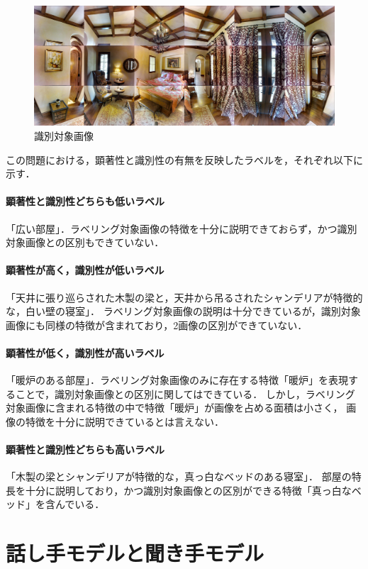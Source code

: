 \documentclass[a4paper,11pt]{jreport}
\begin{document}
\begin{figure}[H]
	\centering
	\includegraphics[width=0.8\linewidth]{figures/3-2_pink_bed.jpg}
	\caption{識別対象画像}
	\label{fig:pink_bed}
\end{figure}

この問題における，顕著性と識別性の有無を反映したラベルを，それぞれ以下に示す．

\paragraph*{顕著性と識別性どちらも低いラベル}
「広い部屋」．ラベリング対象画像の特徴を十分に説明できておらず，かつ識別対象画像との区別もできていない．
\paragraph*{顕著性が高く，識別性が低いラベル}
「天井に張り巡らされた木製の梁と，天井から吊るされたシャンデリアが特徴的な，白い壁の寝室」．
ラベリング対象画像の説明は十分できているが，識別対象画像にも同様の特徴が含まれており，2画像の区別ができていない．
\paragraph*{顕著性が低く，識別性が高いラベル}
「暖炉のある部屋」．ラベリング対象画像のみに存在する特徴「暖炉」を表現することで，識別対象画像との区別に関してはできている．
しかし，ラベリング対象画像に含まれる特徴の中で特徴「暖炉」が画像を占める面積は小さく，
画像の特徴を十分に説明できているとは言えない．
\paragraph*{顕著性と識別性どちらも高いラベル}
「木製の梁とシャンデリアが特徴的な，真っ白なベッドのある寝室」．
部屋の特長を十分に説明しており，かつ識別対象画像との区別ができる特徴「真っ白なベッド」を含んでいる．

\section{話し手モデルと聞き手モデル}
\end{document}
